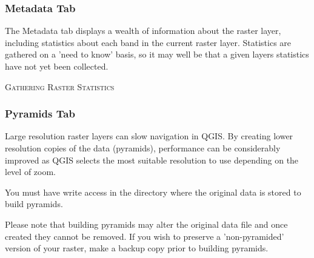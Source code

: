 \subsubsection{Metadata Tab}
The Metadata tab displays a wealth of information about the raster layer,
including statistics about each band in the current raster layer. Statistics are
gathered on a 'need to know' basis, so it may well be that a given layers
statistics have not yet been collected.


\begin{Tip}\caption{\textsc{Gathering Raster Statistics}}
\end{Tip}
\subsubsection{Pyramids Tab}
Large resolution raster layers can slow navigation in QGIS. By creating lower
resolution copies of the data (pyramids), performance can be considerably
improved as QGIS selects the most suitable resolution to use depending on the
level of zoom. 

You must have write access in the directory where the original data is stored to build pyramids. 

Please note that building pyramids may alter the original data file and once created they cannot be removed. If you wish to preserve a 'non-pyramided' version of your raster, make a backup copy prior to building pyramids.
